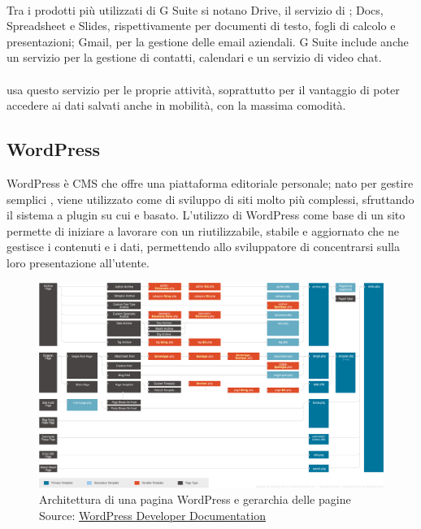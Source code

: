    \paragraph*{} Tra i prodotti più utilizzati di G Suite si notano Drive, il servizio di ; Docs, Spreadsheet e Slides, rispettivamente per documenti di testo, fogli di calcolo e presentazioni; Gmail, per la gestione delle email aziendali. G Suite include anche un servizio per la gestione di contatti, calendari e un servizio di video chat.
   \paragraph*{}
   \nomeAzienda{} usa questo servizio per le proprie attività, soprattutto per il vantaggio di poter accedere ai dati salvati anche in mobilità, con la massima comodità.

   \subsection{WordPress}
   WordPress è \gls{CMS}  che offre una piattaforma editoriale personale; nato per gestire semplici , viene utilizzato come  di sviluppo di siti molto più complessi, sfruttando il sistema a plugin su cui e basato. L'utilizzo di WordPress come base di un sito permette di iniziare a lavorare con un  riutilizzabile, stabile e aggiornato che ne gestisce i contenuti e i dati, permettendo allo sviluppatore di concentrarsi sulla loro presentazione all'utente.


   \begin{figure}[H]
      \begin{center}
         \includegraphics[width=16.5cm,keepaspectratio]{immagini/template-hierarchy}
         \caption[Architettura di una pagina WordPress e gerarchia delle pagine]{Architettura di una pagina WordPress e gerarchia delle pagine
         \\
         Source: \href{https://developer.wordpress.org/themes/basics/template-hierarchy/}{WordPress Developer Documentation}}
      \end{center}
   \end{figure}
